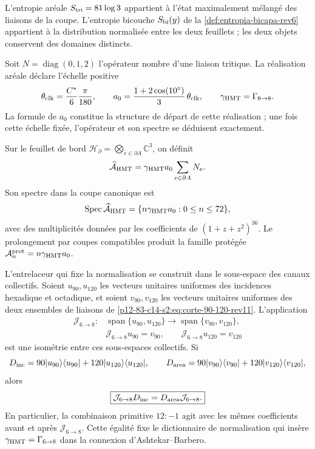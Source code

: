 L’entropie aréale \(S_{\rm tri}=81\log3\) appartient à l’état maximalement
mélangé des liaisons de la coupe. L’entropie bicouche
\(S_{\rm bi}(y)\) de la \cref{def:entropia-bicapa-rev6} appartient à la
distribution normalisée entre les deux feuillets ; les deux objets conservent
des domaines distincts.

Soit \(N=\operatorname{diag}(0,1,2)\) l’opérateur nombre d’une liaison tritique.
La réalisation aréale déclare l’échelle positive
\[
 \theta_{\rm clk}=\frac{C^*}{6}\frac{\pi}{180},
 \qquad
 a_0=\frac{1+2\cos(10^\circ)}{3}\,\theta_{\rm clk},
 \qquad \gamma_{\rm HMT}=\Gamma_{6\to8}.
\]
La formule de \(a_0\) constitue la structure de départ de cette
réalisation ; une fois cette échelle fixée, l’opérateur et son spectre se déduisent
exactement.

\begin{definition}
Sur le feuillet de bord
\(\mathcal H_{\partial}=\bigotimes_{e\in\partial A}\mathbb C^3\), on définit
\begin{equation}
 \widehat{\mathcal A}_{\rm HMT}
 =\gamma_{\rm HMT}a_0\sum_{e\in\partial A}N_e.
 \label{p12-83-c14-s2:eq:operador-area-hmt-rev11}
\end{equation}
Son spectre dans la coupe canonique est
\[
 \operatorname{Spec}\widehat{\mathcal A}_{\rm HMT}
 =\{n\gamma_{\rm HMT}a_0:0\leq n\leq72\},
\]
avec des multiplicités données par les coefficients de
\((1+z+z^2)^{36}\). Le prolongement par coupes compatibles produit la
famille protégée \(\mathcal A_n^{\rm prot}=n\gamma_{\rm HMT}a_0\).
\end{definition}

L’entrelaceur qui fixe la normalisation se construit dans le sous-espace des
canaux collectifs. Soient \(u_{90},u_{120}\) les vecteurs unitaires uniformes
des incidences hexadique et octadique, et soient \(v_{90},v_{120}\) les
vecteurs unitaires uniformes des deux ensembles de liaisons de
\eqref{p12-83-c14-s2:eq:corte-90-120-rev11}. L’application
\begin{equation}
 \begin{aligned}
 \mathcal J_{6\to8}:{}
 &\operatorname{span}\{u_{90},u_{120}\}
 \longrightarrow
 \operatorname{span}\{v_{90},v_{120}\},\\
 &\mathcal J_{6\to8}u_{90}=v_{90},
 \qquad
 \mathcal J_{6\to8}u_{120}=v_{120}
 \end{aligned}
 \label{p12-83-c14-s2:eq:entrelazador-area-barbero-rev11}
\end{equation}
est une isométrie entre ces sous-espaces collectifs. Si
\[
 D_{\rm inc}=90|u_{90}\rangle\langle u_{90}|
 +120|u_{120}\rangle\langle u_{120}|,
 \qquad
 D_{\rm area}=90|v_{90}\rangle\langle v_{90}|
 +120|v_{120}\rangle\langle v_{120}|,
\]
alors
\[
 \boxed{\mathcal J_{6\to8}D_{\rm inc}
 =D_{\rm area}\mathcal J_{6\to8}.}
\]
En particulier, la combinaison primitive \(12:-1\) agit
avec les mêmes coefficients avant et après \(\mathcal J_{6\to8}\). Cette
égalité fixe le dictionnaire de normalisation qui insère
\(\gamma_{\rm HMT}=\Gamma_{6\to8}\) dans la connexion
d’Ashtekar--Barbero.

